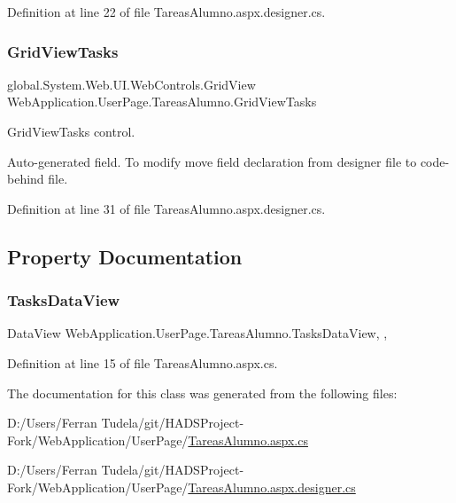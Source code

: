 Definition at line 22 of file Tareas\+Alumno.\+aspx.\+designer.\+cs.

\mbox{\label{classWebApplication_1_1UserPage_1_1TareasAlumno_ac86a63bef568e016d56b44578e6077c7}} 
\subsubsection{\texorpdfstring{GridViewTasks}{GridViewTasks}}
{\footnotesize\ttfamily global.\+System.\+Web.\+U\+I.\+Web\+Controls.\+Grid\+View Web\+Application.\+User\+Page.\+Tareas\+Alumno.\+Grid\+View\+Tasks\hspace{0.3cm}{\ttfamily [protected]}}



Grid\+View\+Tasks control. 

Auto-\/generated field. To modify move field declaration from designer file to code-\/behind file. 

Definition at line 31 of file Tareas\+Alumno.\+aspx.\+designer.\+cs.



\subsection{Property Documentation}
\mbox{\label{classWebApplication_1_1UserPage_1_1TareasAlumno_a1ee89d7ad26a4fb02b51f9c9b653b871}} 
\subsubsection{\texorpdfstring{TasksDataView}{TasksDataView}}
{\footnotesize\ttfamily Data\+View Web\+Application.\+User\+Page.\+Tareas\+Alumno.\+Tasks\+Data\+View\hspace{0.3cm}{\ttfamily [get]}, {\ttfamily [set]}, {\ttfamily [private]}}



Definition at line 15 of file Tareas\+Alumno.\+aspx.\+cs.



The documentation for this class was generated from the following files\+:\begin{DoxyCompactItemize}
\item 
D\+:/\+Users/\+Ferran Tudela/git/\+H\+A\+D\+S\+Project-\/\+Fork/\+Web\+Application/\+User\+Page/\mbox{\hyperlink{TareasAlumno_8aspx_8cs}{Tareas\+Alumno.\+aspx.\+cs}}\item 
D\+:/\+Users/\+Ferran Tudela/git/\+H\+A\+D\+S\+Project-\/\+Fork/\+Web\+Application/\+User\+Page/\mbox{\hyperlink{TareasAlumno_8aspx_8designer_8cs}{Tareas\+Alumno.\+aspx.\+designer.\+cs}}\end{DoxyCompactItemize}
